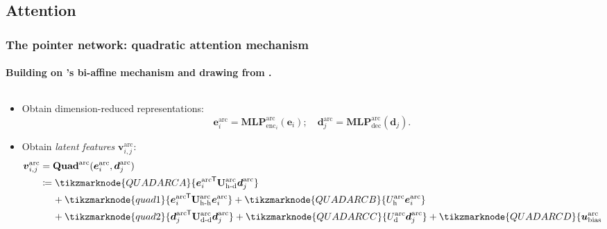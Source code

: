 \documentclass[8pt,handout]{beamer}
\theoremstyle{definition}
\theoremstyle{plain}
\theoremstyle{definition}
\theoremstyle{remark}
\numberwithin{equation}{section}
\numberwithin{figure}{section}
\numberwithin{table}{section}
\newcommand*{\tran}{^{\mkern-1.5mu\mathsf{T}}}
\begin{document}
\subsection{Attention}
\begin{frame}
    \frametitle{The pointer network: quadratic attention mechanism}
    \framesubtitle{Building on \textcite{dozat2016deep}'s bi-affine mechanism and drawing from \textcite{vinyals2015pointer}.}
    \begin{columns}[t,onlytextwidth]
        \begin{column}[t]{0.52\textwidth}
            \begin{itemize}
            \item<2-> Obtain dimension-reduced representations:
            \[
                \boldsymbol{e}^{\text{arc}}_{i} = \mathbf{MLP}_{\text{enc}_{i}}^{\text{arc}}(\boldsymbol{e}_{i}); \quad \boldsymbol{d}^{\text{arc}}_{j} = \mathbf{MLP}_{\text{dec}}^{\text{arc}}(\boldsymbol{d}_{j}).
            \]

            \item<3-> Obtain \textit{latent features} \(\boldsymbol{v}_{i,j}^{\text{arc}}\):
            \begin{align*}
                \boldsymbol{v}^{\text{arc}}_{i,j} &= \mathbf{Quad}^{\text{arc}}(\boldsymbol{e}^{\text{arc}}_{i}, \boldsymbol{d}^{\text{arc}}_{j}) \\
                &\coloneqq \tikzmarknode{QUADARCA}{{\boldsymbol{e}^{\text{arc}}_{i}}\tran \mathbf{U}_{\text{h-d}}^{\text{arc}} \boldsymbol{d}_{j}^{\text{arc}}} \\
                    &\phantom{\coloneqq}\   + \tikzmarknode{quad1}{
                        {\boldsymbol{e}_{i}^{\text{arc}}}\tran \mathbf{U}_{\text{h-h}}^{\text{arc}} \boldsymbol{e}_{i}^{\text{arc}}
                    } + \tikzmarknode{QUADARCB}{U_{\text{h}}^{\text{arc}} \boldsymbol{e}_{i}^{\text{arc}}} \\
                    &\phantom{\coloneqq}\ + \tikzmarknode{quad2}{{\boldsymbol{d}_{j}^{\text{arc}}}\tran \mathbf{U}_{\text{d-d}}^{\text{arc}} \boldsymbol{d}_{j}^{\text{arc}}}
                    + \tikzmarknode{QUADARCC}{U_{\text{d}}^{\text{arc}} \boldsymbol{d}_{j}^{\text{arc}}}
                    + \tikzmarknode{QUADARCD}{\boldsymbol{u}_{\text{bias}}^{\text{arc}}}.
            \end{align*}


\end{itemize}
\end{column}
\end{columns}
\end{frame}
\end{document}
